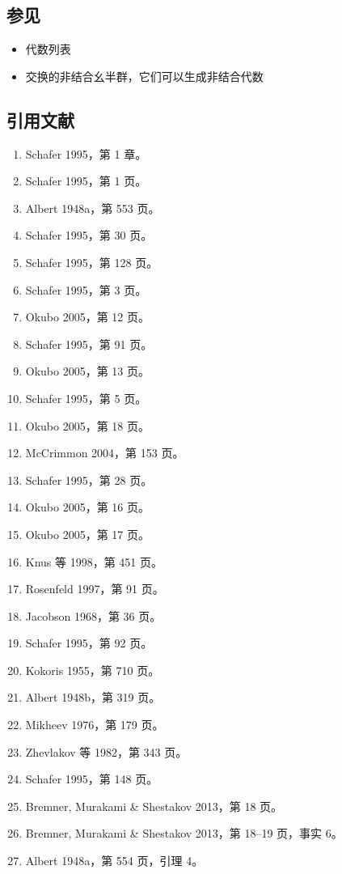 \subsection{参见}
\begin{itemize}
\item 代数列表
\item 交换的非结合幺半群，它们可以生成非结合代数
\end{itemize}
\subsection{引用文献}
\begin{enumerate}
\item Schafer 1995，第 1 章。
\item Schafer 1995，第 1 页。
\item Albert 1948a，第 553 页。
\item Schafer 1995，第 30 页。
\item Schafer 1995，第 128 页。
\item Schafer 1995，第 3 页。
\item Okubo 2005，第 12 页。
\item Schafer 1995，第 91 页。
\item Okubo 2005，第 13 页。
\item Schafer 1995，第 5 页。
\item Okubo 2005，第 18 页。
\item McCrimmon 2004，第 153 页。
\item Schafer 1995，第 28 页。
\item Okubo 2005，第 16 页。
\item Okubo 2005，第 17 页。
\item Knus 等 1998，第 451 页。
\item Rosenfeld 1997，第 91 页。
\item Jacobson 1968，第 36 页。
\item Schafer 1995，第 92 页。
\item Kokoris 1955，第 710 页。
\item Albert 1948b，第 319 页。
\item Mikheev 1976，第 179 页。
\item Zhevlakov 等 1982，第 343 页。
\item Schafer 1995，第 148 页。
\item Bremner, Murakami & Shestakov 2013，第 18 页。
\item Bremner, Murakami & Shestakov 2013，第 18–19 页，事实 6。
\item Albert 1948a，第 554 页，引理 4。

\end{enumerate}
